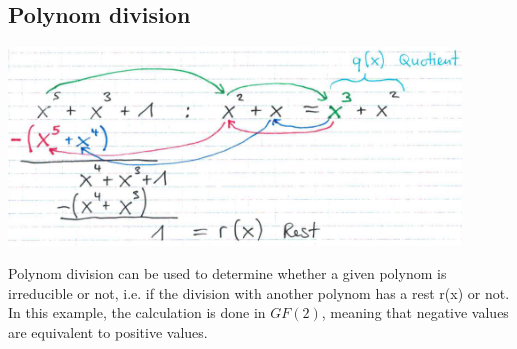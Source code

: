 \subsection{Polynom division}
\begin{minipage}{12.5cm}
	\includegraphics[width=12cm]{./bilder/polynomdivision.png}\\
\end{minipage}
\begin{minipage}{6cm}
	Polynom division can be used to determine whether a given polynom is irreducible or not, i.e. if the division with another polynom has a rest r(x) or not.
	In this example, the calculation is done in $GF(2)$, meaning that negative values are equivalent to positive values.
\end{minipage}


